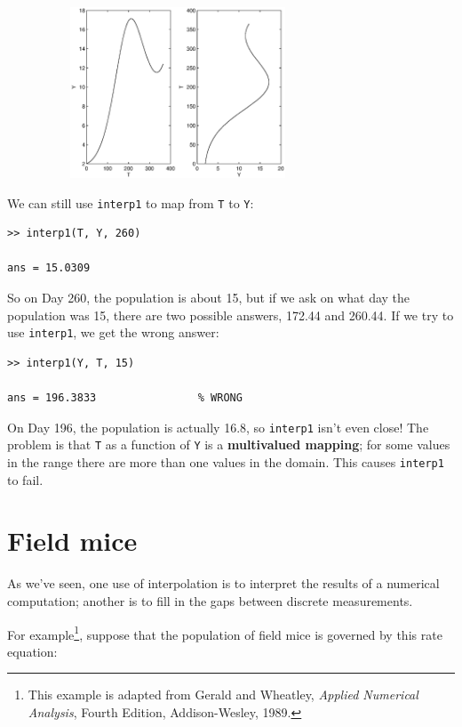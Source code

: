 \documentclass[
]{book}
\begin{document}
\beforefig
\centerline{\includegraphics[height=2in,width=4in]{figs/ratplot2.eps}}

We can still use {\tt interp1} to map from {\tt T} to {\tt Y}:

\begin{verbatim}
>> interp1(T, Y, 260)

ans = 15.0309
\end{verbatim}

So on Day 260, the population is about 15, but if we ask on what
day the population was 15, there are two possible answers, 172.44
and 260.44.  If we try to use {\tt interp1}, we get the wrong answer:

\begin{verbatim}
>> interp1(Y, T, 15)

ans = 196.3833                % WRONG
\end{verbatim}

On Day 196, the population is actually 16.8, so {\tt interp1} isn't
even close!  The problem is that {\tt T} as a function of {\tt Y} is a
{\bf multivalued mapping}; for some values in the range there are more
than one values in the domain.  This causes {\tt interp1} to fail.


\section{Field mice}

As we've seen, one use of interpolation is to interpret the results
of a numerical computation; another is to fill in the gaps between
discrete measurements.

For example\footnote{This example is adapted from Gerald and Wheatley,
{\em Applied Numerical Analysis}, Fourth Edition, Addison-Wesley,
1989.}, suppose that the population of field mice is governed by this
rate equation:
\end{document}
